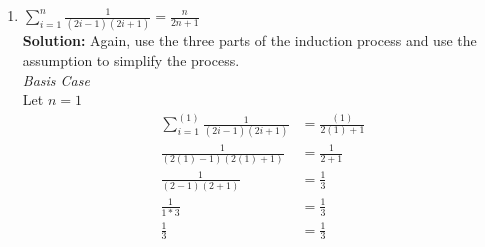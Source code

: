 \documentclass[11pts]{article}
\begin{document}
\begin{enumerate}
\begin {enumerate}
  \newpage %
  \textit{To Show}\\
  To prove the formula inductively, let $n=n+1$:
  \begin{align*}
    \sum_{i=1}^{n+1}{(-1)^{i+1}i^2} &= \frac{(-1)^{(n+1)+1}(n+1)((n+1)+1)}{2} \\
    \sum_{i=n+1}^{n+1}{(-1)^{i+1}i^2}+\sum_{i=1}^{n+1}{(-1)^{i+1}i^2} &= 
         \frac{(-1)^{n+2}(n+1)(n+2)}{2}   \\
    (-1)^{n+2}(n+1)^{2}+\sum_{i=1}^{n+1}{(-1)^{i+1}i^2} &= 
         \frac{(-1)^{n+2}(n^{2}+3n+2)}{2} \\
    (-1)^{n+2}(n+1)^{2}+\sum_{i=1}^{n+1}{(-1)^{i+1}i^2} &= 
         \frac{(-1)^{n+2}(n^{2}+3n+2)}{2} \\
    (-1)^{n+2}(n+1)^{2}+\sum_{i=1}^{n+1}{(-1)^{i+1}i^2} &= 
         \frac{(-1)^{n+2}(2n^{2}+4n+2)}{2}-\frac{(-1)^{n+2}(n^{2}+n)}{2} \\
    (-1)^{n + 2} (n + 1)^{2} + \sum_{i = 1}^{n + 1}{(-1)^{i + 1}i^2} &= 
         \frac{(-1)^{n+2}(2n^{2}+4n+2)}{2}-\frac{(-1)(-1)^{n+1}(n^{2}+n)}{2} \\
    (-1)^{n+2}(n^{2}+2n+1)+\sum_{i=1}^{n+1}{(-1)^{i+1}i^2} &= 
         \frac{(-1)^{n+2}(2n^{2}+4n+2)}{2}+\frac{(-1)^{n+1}(n^{2}+n)}{2} \\
    (-1)^{n+2}(n^{2}+2n+1)+\sum_{i=1}^{n+1}{(-1)^{i+1}i^2} &= 
         \frac{(-1)^{n+2}(2n^{2}+4n+2)}{2}+\frac{(-1)^{n+1}n(n+1)}{2} \\
    (-1)^{n+2}(n^{2}+2n+1) &= \frac{(-1)^{n+2}(2n^{2}+4n+2)}{2}
        \text{   By the Assumption}  \\
    (-1)^{n+2}(n^{2}+2n+1) &= (-1)^{n+2}(2n^{2}+2n+1)
  \end{align*}
  \newpage

  \item $ \sum_{i=1}^{n}{\frac{1}{(2i-1)(2i+1)}} = \frac{n}{2n+1} $ \\

  \textbf{Solution:} Again, use the three parts of the induction process
  and use the assumption to simplify the process.\\

  \textit{Basis Case}\\
  Let $n = 1$
  \begin{align*}
    \sum_{i=1}^{(1)}{\frac{1}{(2i - 1)(2i + 1)}} &= \frac{(1)}{2(1) + 1} \\
    \frac{1}{(2(1) - 1)(2(1) + 1)} &= \frac{1}{2 + 1} \\
    \frac{1}{(2 - 1)(2 + 1)} &= \frac{1}{3} \\
    \frac{1}{1 * 3} &= \frac{1}{3} \\
    \frac{1}{3} &= \frac{1}{3}
  \end{align*}


\end{enumerate}
\end{enumerate}
\end{document}
